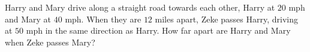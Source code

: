 Harry and Mary drive along a straight road towards each other, Harry at $20$ mph and Mary at $40$ mph. When they are $12$ miles apart, Zeke passes Harry, driving at $50$ mph in the same direction as Harry. How far apart are Harry and Mary when Zeke passes Mary?
